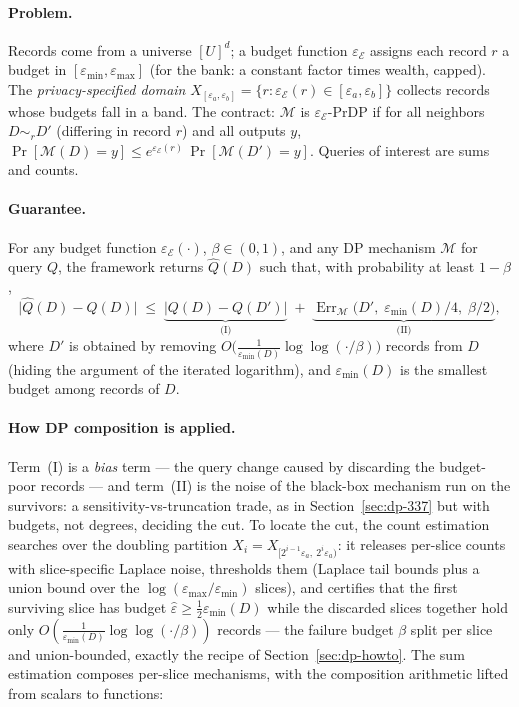 \paragraph{Problem.}
Records come from a universe $[U]^d$; a budget function $\varepsilon_\mathcal{E}$
assigns each record $r$ a budget in $[\varepsilon_{\min}, \varepsilon_{\max}]$ (for
the bank: a constant factor times wealth, capped). The \emph{privacy-specified domain}
$X_{[\varepsilon_a, \varepsilon_b]} = \{r : \varepsilon_\mathcal{E}(r) \in
[\varepsilon_a, \varepsilon_b]\}$ collects records whose budgets fall in a band. The
contract: $\mathcal{M}$ is $\varepsilon_\mathcal{E}$-PrDP if for all neighbors
$D \sim_r D'$ (differing in record $r$) and all outputs $y$,
$\Pr[\mathcal{M}(D) = y] \le e^{\varepsilon_\mathcal{E}(r)}\,
\Pr[\mathcal{M}(D') = y]$. Queries of interest are sums and counts.

\paragraph{Guarantee.}

\begin{theorem}\label{thm:dp-263-main}
For any budget function $\varepsilon_\mathcal{E}(\cdot)$, $\beta \in (0,1)$, and any DP
mechanism $\mathcal{M}$ for query $Q$, the framework returns $\hat Q(D)$ such that, with
probability at least $1-\beta$,
\[
\bigl|\hat Q(D) - Q(D)\bigr| \;\le\;
\underbrace{\bigl|Q(D) - Q(D')\bigr|}_{\text{(I)}}
\;+\;
\underbrace{\operatorname{Err}_{\mathcal{M}}\bigl(D',\;
\varepsilon_{\min}(D)/4,\; \beta/2\bigr)}_{\text{(II)}},
\]
where $D'$ is obtained by removing
$O\bigl(\tfrac{1}{\varepsilon_{\min}(D)}\log\log(\cdot/\beta)\bigr)$ records from $D$
(hiding the argument of the iterated logarithm), and $\varepsilon_{\min}(D)$ is the
smallest budget among records of $D$. \eop
\end{theorem}

\paragraph{How DP composition is applied.}
Term~(I) is a \emph{bias} term --- the query change caused by discarding the budget-poor
records --- and term~(II) is the noise of the black-box mechanism run on the survivors:
a sensitivity-vs-truncation trade, as in Section~\ref{sec:dp-337} but with budgets, not
degrees, deciding the cut. To locate the cut, the count estimation searches over the
doubling partition $X_i = X_{[2^{i-1}\varepsilon_a,\ 2^i\varepsilon_a)}$: it releases
per-slice counts with slice-specific Laplace noise, thresholds them (Laplace tail
bounds plus a union bound over the $\log(\varepsilon_{\max}/\varepsilon_{\min})$
slices), and certifies that the first surviving slice has budget
$\hat\varepsilon \ge \tfrac12\varepsilon_{\min}(D)$ while the discarded slices together
hold only $O(\tfrac1{\varepsilon_{\min}(D)} \log\log(\cdot/\beta))$ records --- the
failure budget $\beta$ split per slice and union-bounded, exactly the recipe of
Section~\ref{sec:dp-howto}. The sum estimation composes per-slice mechanisms, with the
composition arithmetic lifted from scalars to functions:

